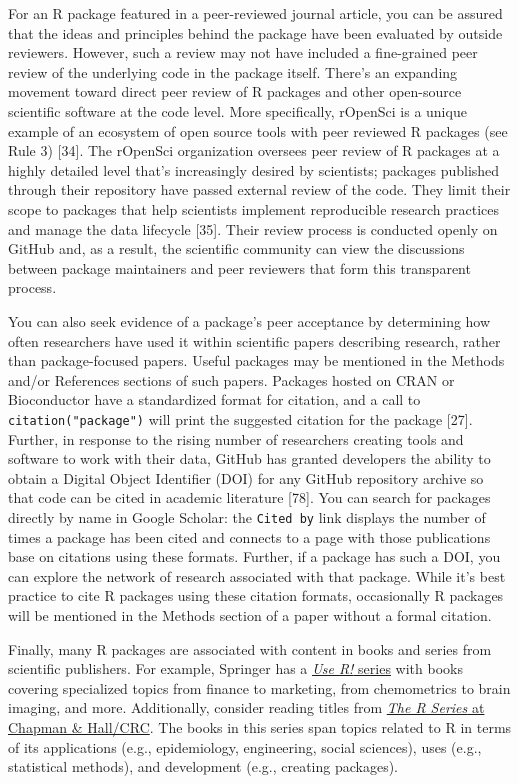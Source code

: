 \documentclass[10pt,letterpaper]{article}
\begin{document}
For an R package featured in a peer-reviewed journal article, you can be
assured that the ideas and principles behind the package have been
evaluated by outside reviewers. However, such a review may not have
included a fine-grained peer review of the underlying code in the
package itself. There's an expanding movement toward direct peer review
of R packages and other open-source scientific software at the code
level. More specifically, rOpenSci is a unique example of an ecosystem
of open source tools with peer reviewed R packages (see Rule 3)
{[}34{]}. The rOpenSci organization oversees peer review of R packages
at a highly detailed level that's increasingly desired by scientists;
packages published through their repository have passed external review
of the code. They limit their scope to packages that help scientists
implement reproducible research practices and manage the data lifecycle
{[}35{]}. Their review process is conducted openly on GitHub and, as a
result, the scientific community can view the discussions between
package maintainers and peer reviewers that form this transparent
process.

You can also seek evidence of a package's peer acceptance by determining
how often researchers have used it within scientific papers describing
research, rather than package-focused papers. Useful packages may be
mentioned in the Methods and/or References sections of such papers.
Packages hosted on CRAN or Bioconductor have a standardized format for
citation, and a call to \texttt{citation("package")} will print the
suggested citation for the package {[}27{]}. Further, in response to the
rising number of researchers creating tools and software to work with
their data, GitHub has granted developers the ability to obtain a
Digital Object Identifier (DOI) for any GitHub repository archive so
that code can be cited in academic literature {[}78{]}. You can search
for packages directly by name in Google Scholar: the \texttt{Cited\ by}
link displays the number of times a package has been cited and connects
to a page with those publications base on citations using these formats.
Further, if a package has such a DOI, you can explore the network of
research associated with that package. While it's best practice to cite
R packages using these citation formats, occasionally R packages will be
mentioned in the Methods section of a paper without a formal citation.

Finally, many R packages are associated with content in books and series
from scientific publishers. For example, Springer has a
\href{https://www.springer.com/series/6991}{\emph{Use R!} series} with
books covering specialized topics from finance to marketing, from
chemometrics to brain imaging, and more. Additionally, consider reading
titles from
\href{https://www.routledge.com/Chapman--HallCRC-The-R-Series/book-series/CRCTHERSER}{\emph{The
R Series} at Chapman \& Hall/CRC}. The books in this series span topics
related to R in terms of its applications (e.g., epidemiology,
engineering, social sciences), uses (e.g., statistical methods), and
development (e.g., creating packages).
\end{document}
